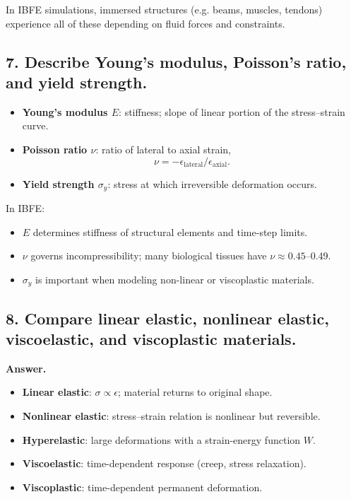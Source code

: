 \documentclass[12pt]{article}
\begin{document}
In IBFE simulations, immersed structures (e.g. beams, muscles, tendons)
experience all of these depending on fluid forces and constraints.


\subsection*{7. Describe Young’s modulus, Poisson’s ratio, and yield strength.}


\begin{itemize}
    \item \textbf{Young's modulus $E$}: stiffness; slope of linear portion of the stress–strain curve.
    \item \textbf{Poisson ratio $\nu$}: ratio of lateral to axial strain,
    \[
    \nu = -\epsilon_{\text{lateral}}/\epsilon_{\text{axial}}.
    \]
    \item \textbf{Yield strength $\sigma_y$}: stress at which irreversible deformation occurs.
\end{itemize}

In IBFE:
\begin{itemize}
    \item $E$ determines stiffness of structural elements and time-step limits.
    \item $\nu$ governs incompressibility; many biological tissues have $\nu \approx 0.45$–0.49.
    \item $\sigma_y$ is important when modeling non-linear or viscoplastic materials.
\end{itemize}


\subsection*{8. Compare linear elastic, nonlinear elastic, viscoelastic, and viscoplastic materials.}

\textbf{Answer.}


\begin{itemize}
    \item \textbf{Linear elastic}: $\sigma \propto \epsilon$; material returns to original shape.
    \item \textbf{Nonlinear elastic}: stress–strain relation is nonlinear but reversible.
    \item \textbf{Hyperelastic}: large deformations with a strain-energy function $W$.
    \item \textbf{Viscoelastic}: time-dependent response (creep, stress relaxation).
    \item \textbf{Viscoplastic}: time-dependent permanent deformation.
\end{itemize}
\end{document}

